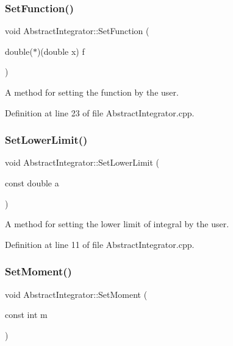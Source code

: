 \subsubsection{\texorpdfstring{Set\+Function()}{SetFunction()}}
{\footnotesize\ttfamily void Abstract\+Integrator\+::\+Set\+Function (\begin{DoxyParamCaption}\item[{double($\ast$)(double x)}]{f }\end{DoxyParamCaption})}



A method for setting the function by the user. 



Definition at line 23 of file Abstract\+Integrator.\+cpp.

\mbox{\label{class_abstract_integrator_aea1949bda48ee6f4501475e8da26aaeb}} 
\subsubsection{\texorpdfstring{Set\+Lower\+Limit()}{SetLowerLimit()}}
{\footnotesize\ttfamily void Abstract\+Integrator\+::\+Set\+Lower\+Limit (\begin{DoxyParamCaption}\item[{const double}]{a }\end{DoxyParamCaption})}



A method for setting the lower limit of integral by the user. 



Definition at line 11 of file Abstract\+Integrator.\+cpp.

\mbox{\label{class_abstract_integrator_a871fa27363ee09b98c964ccaa33da100}} 
\subsubsection{\texorpdfstring{Set\+Moment()}{SetMoment()}}
{\footnotesize\ttfamily void Abstract\+Integrator\+::\+Set\+Moment (\begin{DoxyParamCaption}\item[{const int}]{m }\end{DoxyParamCaption})}



